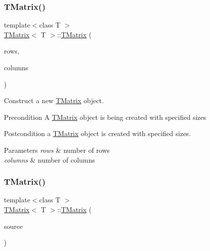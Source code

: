\subsubsection{\texorpdfstring{TMatrix()}{TMatrix()}\hspace{0.1cm}{\footnotesize\ttfamily [2/4]}}
{\footnotesize\ttfamily template$<$class T $>$ \\
\mbox{\hyperlink{class_t_matrix}{T\+Matrix}}$<$ T $>$\+::\mbox{\hyperlink{class_t_matrix}{T\+Matrix}} (\begin{DoxyParamCaption}\item[{int}]{rows,  }\item[{int}]{columns }\end{DoxyParamCaption})}



Construct a new \mbox{\hyperlink{class_t_matrix}{T\+Matrix}} object. 

\begin{DoxyPrecond}{Precondition}
A \mbox{\hyperlink{class_t_matrix}{T\+Matrix}} object is being created with specified sizes 
\end{DoxyPrecond}
\begin{DoxyPostcond}{Postcondition}
a \mbox{\hyperlink{class_t_matrix}{T\+Matrix}} object is created with specified sizes.
\end{DoxyPostcond}

\begin{DoxyParams}{Parameters}
{\em rows} & number of rows \\
\hline
{\em columns} & number of columns \\
\hline
\end{DoxyParams}
\mbox{\label{class_t_matrix_a0eb2940e7ad11d4cd357541d2efbe6ce}} 
\subsubsection{\texorpdfstring{TMatrix()}{TMatrix()}\hspace{0.1cm}{\footnotesize\ttfamily [3/4]}}
{\footnotesize\ttfamily template$<$class T $>$ \\
\mbox{\hyperlink{class_t_matrix}{T\+Matrix}}$<$ T $>$\+::\mbox{\hyperlink{class_t_matrix}{T\+Matrix}} (\begin{DoxyParamCaption}\item[{const \mbox{\hyperlink{class_t_matrix}{T\+Matrix}}$<$ T $>$ \&}]{source }\end{DoxyParamCaption})}



